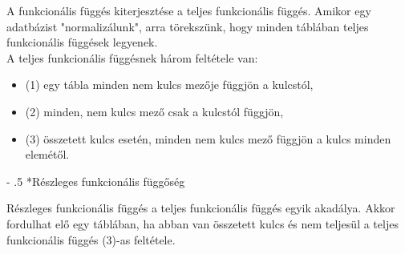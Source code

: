 \documentclass[tikz,12pt,margin=0px]{article}
\makeatletter
\renewcommand\paragraph{%
	\@startsection{paragraph}{4}{0mm}%
	{-\baselineskip}%
	{.5\baselineskip}%
	{\normalfont\normalsize\bfseries}}
\makeatother
\begin{document}
    \noindent A funkcionális függés kiterjesztése a teljes funkcionális függés. Amikor egy adatbázist "normalizálunk", arra törekszünk, hogy minden táblában teljes funkcionális függések legyenek.\\

    \noindent A teljes funkcionális függésnek három feltétele van:
    \begin{itemize}
        \item (1) egy tábla minden nem kulcs mezője függjön a kulcstól,
        \item (2) minden, nem kulcs mező csak a kulcstól függjön,
        \item (3) összetett kulcs esetén, minden nem kulcs mező függjön a kulcs minden elemétől.
    \end{itemize}

    \paragraph*{Részleges funkcionális függőség\\}

    \noindent Részleges funkcionális függés a teljes funkcionális függés egyik akadálya. Akkor fordulhat elő egy táblában, ha abban van összetett kulcs és nem teljesül a teljes funkcionális függés (3)-as feltétele.\\
\end{document}
